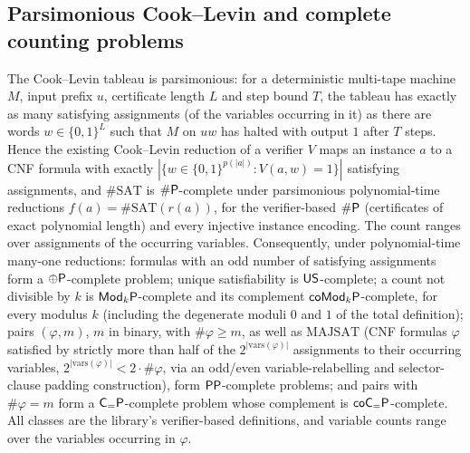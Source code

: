 \begin{result}
\subsection{Parsimonious Cook--Levin and complete counting problems}
The Cook--Levin tableau is parsimonious: for a deterministic multi-tape machine $M$, input
prefix $u$, certificate length $L$ and step bound $T$, the tableau has exactly as many
satisfying assignments (of the variables occurring in it) as there are words
$w\in\{0,1\}^L$ such that $M$ on $uw$ has halted with output $1$ after $T$ steps. Hence the
existing Cook--Levin reduction of a verifier $V$ maps an instance $a$ to a CNF formula with
exactly $|\{w\in\{0,1\}^{p(|a|)} : V(a,w)=1\}|$ satisfying assignments, and $\#\mathrm{SAT}$
is $\#\mathsf{P}$-complete under parsimonious polynomial-time reductions $f(a)=\#\mathrm{SAT}(r(a))$,
for the verifier-based $\#\mathsf{P}$ (certificates of exact polynomial length) and every
injective instance encoding. The count ranges over assignments of the occurring variables.
Consequently, under polynomial-time many-one reductions: formulas with an odd number of
satisfying assignments form a $\oplus\mathsf{P}$-complete problem; unique satisfiability is
$\mathsf{US}$-complete; a count not divisible by $k$ is $\mathsf{Mod}_k\mathsf{P}$-complete and its
complement $\mathsf{coMod}_k\mathsf{P}$-complete, for every modulus $k$ (including the degenerate
moduli $0$ and $1$ of the total definition); pairs $(\varphi,m)$, $m$ in binary, with
$\#\varphi\ge m$, as well as $\mathrm{MAJSAT}$ (CNF formulas $\varphi$ satisfied by strictly
more than half of the $2^{|\mathrm{vars}(\varphi)|}$ assignments to their occurring variables,
$2^{|\mathrm{vars}(\varphi)|} < 2\cdot\#\varphi$, via an odd/even variable-relabelling and
selector-clause padding construction), form $\mathsf{PP}$-complete problems; and pairs with
$\#\varphi=m$ form a
$\mathsf{C_{=}P}$-complete problem whose complement is $\mathsf{coC_{=}P}$-complete. All classes are the
library's verifier-based definitions, and variable counts range over the variables occurring in
$\varphi$.
\citep{Valiant1979}\citep[Chapter 18]{Papadimitriou94}\citep{PapadimitriouZachos1983}\citep{BlassGurevich1982}\citep{Gill1977}\citep{Simon1975}\citep{CaiHemachandra1990,BeigelGillHertrampf1990,Wagner1986}\citep{Fortnow1997}

\end{result}
